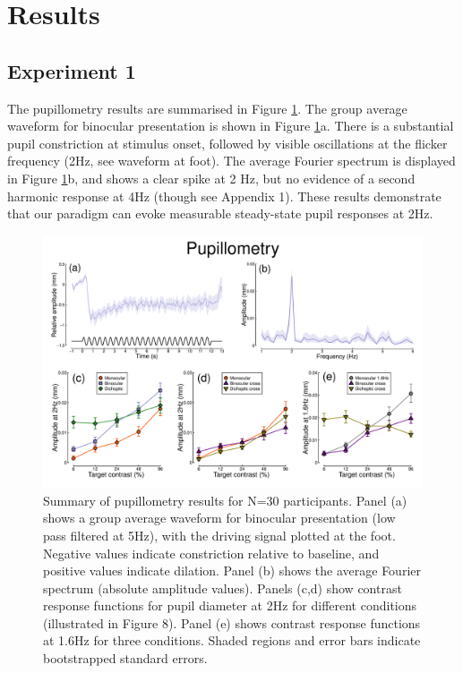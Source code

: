 \documentclass[
]{article}
\begin{document}
\hypertarget{results}{%
\section{Results}\label{results}}

\hypertarget{experiment-1}{%
\subsection{Experiment 1}\label{experiment-1}}

The pupillometry results are summarised in Figure \ref{fig:pupildata}. The group average waveform for binocular presentation is shown in Figure \ref{fig:pupildata}a. There is a substantial pupil constriction at stimulus onset, followed by visible oscillations at the flicker frequency (2Hz, see waveform at foot). The average Fourier spectrum is displayed in Figure \ref{fig:pupildata}b, and shows a clear spike at 2 Hz, but no evidence of a second harmonic response at 4Hz (though see Appendix 1). These results demonstrate that our paradigm can evoke measurable steady-state pupil responses at 2Hz.

\begin{figure}

{\centering \includegraphics{Figures/pupildata} 

}

\caption{Summary of pupillometry results for N=30 participants. Panel (a) shows a group average waveform for binocular presentation (low pass filtered at 5Hz), with the driving signal plotted at the foot. Negative values indicate constriction relative to baseline, and positive values indicate dilation. Panel (b) shows the average Fourier spectrum (absolute amplitude values). Panels (c,d) show contrast response functions for pupil diameter at 2Hz for different conditions (illustrated in Figure 8). Panel (e) shows contrast response functions at 1.6Hz for three conditions. Shaded regions and error bars indicate bootstrapped standard errors.}\label{fig:pupildata}
\end{figure}
\end{document}
